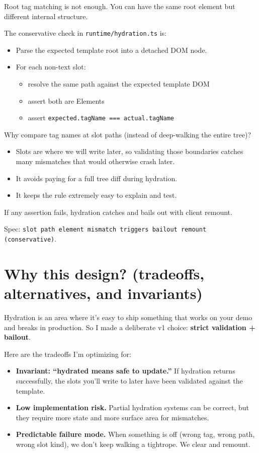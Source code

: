 Root tag matching is not enough. You can have the same root element but different internal structure.

The conservative check in \texttt{runtime/hydration.ts} is:

\begin{itemize}
  \item Parse the expected template root into a detached DOM node.
  \item For each non-text slot:
    \begin{itemize}
      \item resolve the same path against the expected template DOM
      \item assert both are Elements
      \item assert \texttt{expected.tagName === actual.tagName}
    \end{itemize}
\end{itemize}

Why compare tag names at slot paths (instead of deep-walking the entire tree)?

\begin{itemize}
  \item Slots are where we will write later, so validating those boundaries catches many mismatches that would otherwise crash later.
  \item It avoids paying for a full tree diff during hydration.
  \item It keeps the rule extremely easy to explain and test.
\end{itemize}

If any assertion fails, hydration catches and bails out with client remount.

Spec: \texttt{slot path element mismatch triggers bailout remount (conservative)}.

\section{Why this design? (tradeoffs, alternatives, and invariants)}

Hydration is an area where it’s easy to ship something that works on your demo and breaks in production.
So I made a deliberate v1 choice: \textbf{strict validation + bailout}.

Here are the tradeoffs I’m optimizing for:

\begin{itemize}
  \item \textbf{Invariant: “hydrated means safe to update.”}
  If hydration returns successfully, the slots you’ll write to later have been validated against the template.

  \item \textbf{Low implementation risk.}
  Partial hydration systems can be correct, but they require more state and more surface area for mismatches.

  \item \textbf{Predictable failure mode.}
  When something is off (wrong tag, wrong path, wrong slot kind), we don’t keep walking a tightrope.
  We clear and remount.
\end{itemize}

